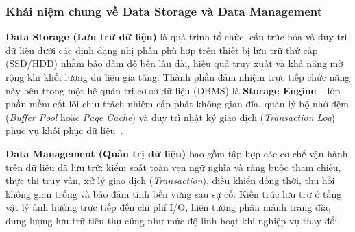 %
%        

\subsubsection{Khái niệm chung về Data Storage và Data Management}

\textbf{Data Storage (Lưu trữ dữ liệu)} là quá trình tổ chức, cấu trúc hóa và duy trì dữ liệu dưới các định dạng nhị phân phù hợp trên thiết bị lưu trữ thứ cấp (SSD/HDD) nhằm bảo đảm độ bền lâu dài, hiệu quả truy xuất và khả năng mở rộng khi khối lượng dữ liệu gia tăng. Thành phần đảm nhiệm trực tiếp chức năng này bên trong một hệ quản trị cơ sở dữ liệu (DBMS) là \textbf{Storage Engine} -- lớp phần mềm cốt lõi chịu trách nhiệm cấp phát không gian đĩa, quản lý bộ nhớ đệm (\textit{Buffer Pool} hoặc \textit{Page Cache}) và duy trì nhật ký giao dịch (\textit{Transaction Log}) phục vụ khôi phục dữ liệu~\cite{t1_date2004,t1_silberschatz2019}.

\textbf{Data Management (Quản trị dữ liệu)} bao gồm tập hợp các cơ chế vận hành trên dữ liệu đã lưu trữ: kiểm soát toàn vẹn ngữ nghĩa và ràng buộc tham chiếu, thực thi truy vấn, xử lý giao dịch (\textit{Transaction}), điều khiển đồng thời, thu hồi không gian trống và bảo đảm tính bền vững sau sự cố. Kiến trúc lưu trữ ở tầng vật lý ảnh hưởng trực tiếp đến chi phí I/O, hiện tượng phân mảnh trang đĩa, dung lượng lưu trữ tiêu thụ cũng như mức độ linh hoạt khi nghiệp vụ thay đổi.

